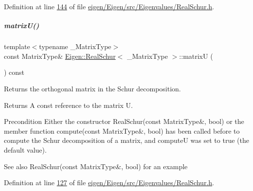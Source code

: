 Definition at line \hyperlink{eigen_2_eigen_2src_2_eigenvalues_2_real_schur_8h_source_l00144}{144} of file \hyperlink{eigen_2_eigen_2src_2_eigenvalues_2_real_schur_8h_source}{eigen/\+Eigen/src/\+Eigenvalues/\+Real\+Schur.\+h}.

\mbox{\label{group___eigenvalues___module_a85622ccbecff99c8933d21f0a22b22bb}} 
\subparagraph{\texorpdfstring{matrix\+U()}{matrixU()}\hspace{0.1cm}{\footnotesize\ttfamily [1/2]}}
{\footnotesize\ttfamily template$<$typename \+\_\+\+Matrix\+Type$>$ \\
const Matrix\+Type\& \hyperlink{group___eigenvalues___module_class_eigen_1_1_real_schur}{Eigen\+::\+Real\+Schur}$<$ \+\_\+\+Matrix\+Type $>$\+::matrixU (\begin{DoxyParamCaption}{ }\end{DoxyParamCaption}) const\hspace{0.3cm}{\ttfamily [inline]}}



Returns the orthogonal matrix in the Schur decomposition. 

\begin{DoxyReturn}{Returns}
A const reference to the matrix U.
\end{DoxyReturn}
\begin{DoxyPrecond}{Precondition}
Either the constructor Real\+Schur(const Matrix\+Type\&, bool) or the member function compute(const Matrix\+Type\&, bool) has been called before to compute the Schur decomposition of a matrix, and {\ttfamily computeU} was set to true (the default value).
\end{DoxyPrecond}
\begin{DoxySeeAlso}{See also}
Real\+Schur(const Matrix\+Type\&, bool) for an example 
\end{DoxySeeAlso}


Definition at line \hyperlink{eigen_2_eigen_2src_2_eigenvalues_2_real_schur_8h_source_l00127}{127} of file \hyperlink{eigen_2_eigen_2src_2_eigenvalues_2_real_schur_8h_source}{eigen/\+Eigen/src/\+Eigenvalues/\+Real\+Schur.\+h}.

